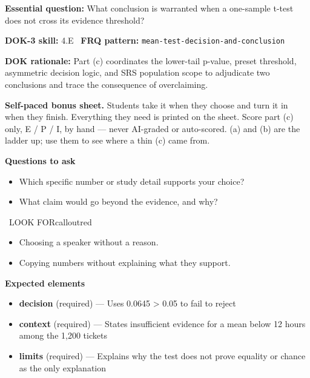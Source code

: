 \documentclass[11pt]{article}
\begin{document}
\textbf{Essential question:} What conclusion is warranted when a one-sample t-test does not cross its evidence threshold?\par
\textbf{DOK-3 skill:} 4.E \textperiodcentered\ \textbf{FRQ pattern:} {\small\texttt{mean-\allowbreak{}test-\allowbreak{}decision-\allowbreak{}and-\allowbreak{}conclusion}}\par
\textbf{DOK rationale:} Part (c) coordinates the lower-tail p-value, preset threshold, asymmetric decision logic, and SRS population scope to adjudicate two conclusions and trace the consequence of overclaiming.\par

\textbf{Self-paced bonus sheet.} Students take it when they choose and turn it in when they finish. Everything they need is printed on the sheet. Score part (c) only, E / P / I, by hand --- never AI-graded or auto-scored. (a) and (b) are the ladder up; use them to see where a thin (c) came from.\par

\textbf{Questions to ask}
\begin{itemize}[leftmargin=1.5em,itemsep=2pt,topsep=2pt]
  \item Which specific number or study detail supports your choice?
  \item What claim would go beyond the evidence, and why?
\end{itemize}

\begin{callout}{\IconWarn\ LOOK FOR}{calloutred}
\begin{itemize}[leftmargin=1.5em,itemsep=2pt,topsep=2pt]
  \item Choosing a speaker without a reason.
  \item Copying numbers without explaining what they support.
\end{itemize}
\end{callout}


\textbf{Expected elements}
\begin{itemize}[leftmargin=1.5em,itemsep=2pt,topsep=2pt]
  \item \textbf{decision} (required) --- Uses 0.0645 > 0.05 to fail to reject
  \item \textbf{context} (required) --- States insufficient evidence for a mean below 12 hours among the 1,200 tickets
  \item \textbf{limits} (required) --- Explains why the test does not prove equality or chance as the only explanation
\end{itemize}
\end{document}
